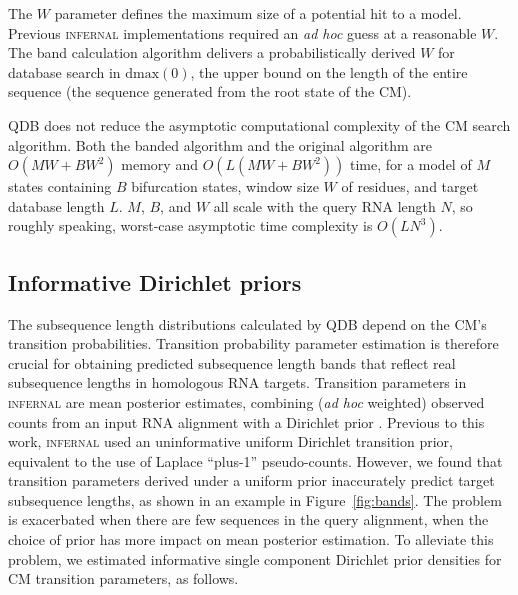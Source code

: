 \documentclass[11pt]{article}
\newif\ifdraft
\begin{document}
The $W$ parameter defines the maximum size of a potential hit to a
model. Previous \textsc{infernal} implementations required an \emph{ad
hoc} guess at a reasonable $W$. The band calculation algorithm
delivers a probabilistically derived $W$ for database search in
$\mbox{dmax}(0)$, the upper bound on the length of the entire
sequence (the sequence generated from the root state of the CM).

QDB does not reduce the asymptotic computational complexity of the CM
search algorithm.  Both the banded algorithm and the original
algorithm are $O(MW + BW^2)$ memory and $O(L(MW + BW^2))$ time, for a
model of $M$ states containing $B$ bifurcation states, window size $W$
of residues, and target database length $L$.  $M$, $B$, and $W$ all
scale with the query RNA length $N$, so roughly speaking,
worst-case asymptotic time complexity is $O(L N^3)$.


\subsection{Informative Dirichlet priors}

The subsequence length distributions calculated by QDB depend on the
CM's transition probabilities. Transition probability parameter
estimation is therefore crucial for obtaining predicted subsequence
length bands that reflect real subsequence lengths in homologous RNA
targets. Transition parameters in \textsc{infernal} are mean posterior
estimates, combining (\emph{ad hoc} weighted) observed counts from an
input RNA alignment with a Dirichlet prior \cite{infguide03}.
Previous to this work, \textsc{infernal} used an uninformative uniform
Dirichlet transition prior, equivalent to the use of Laplace
``plus-1'' pseudo-counts. However, we found that transition parameters
derived under a uniform prior inaccurately predict target subsequence
lengths, as shown in
an example in Figure~\ref{fig:bands}.  The problem is exacerbated when
there are few sequences in the query alignment, when the choice of
prior has more impact on mean posterior estimation.  To alleviate this
problem, we estimated informative single component Dirichlet prior
densities for CM transition parameters, as follows.

\ifdraft

\fi
\end{document}
